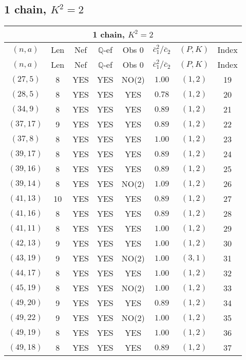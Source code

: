 \subsection{1 chain, $K^2 = 2$}
\begin{longtable}{|c|c|c|c|c|c|c|c|}
\hline
\multicolumn{8}{|c|}{1 chain, $K^2 = 2$}\\
\hline
$(n,a)$ & Len & Nef & $\mathbb Q$-ef & Obs 0 & $\overline c_1^2 / \overline c_2$ & $(P,K)$ & Index\\
\hline
\endfirsthead

\hline
$(n,a)$ & Len & Nef & $\mathbb Q$-ef & Obs 0 & $\overline c_1^2 / \overline c_2$ & $(P,K)$ & Index\\
\hline
\endhead
\hline
\endfoot

$(27,5)$ & 8 & YES & YES & NO(2) & $1.00$ & $(1,2)$ & 19\\
$(28,5)$ & 8 & YES & YES & YES & $0.78$ & $(1,2)$ & 20\\
$(34,9)$ & 8 & YES & YES & YES & $0.89$ & $(1,2)$ & 21\\
$(37,17)$ & 9 & YES & YES & YES & $0.89$ & $(1,2)$ & 22\\
$(37,8)$ & 8 & YES & YES & YES & $1.00$ & $(1,2)$ & 23\\
$(39,17)$ & 8 & YES & YES & YES & $0.89$ & $(1,2)$ & 24\\
$(39,16)$ & 8 & YES & YES & YES & $0.89$ & $(1,2)$ & 25\\
$(39,14)$ & 8 & YES & YES & NO(2) & $1.09$ & $(1,2)$ & 26\\
$(41,13)$ & 10 & YES & YES & YES & $0.89$ & $(1,2)$ & 27\\
$(41,16)$ & 8 & YES & YES & YES & $0.89$ & $(1,2)$ & 28\\
$(41,11)$ & 8 & YES & YES & YES & $1.00$ & $(1,2)$ & 29\\
$(42,13)$ & 9 & YES & YES & YES & $1.00$ & $(1,2)$ & 30\\
$(43,19)$ & 9 & YES & YES & NO(2) & $1.00$ & $(3,1)$ & 31\\
$(44,17)$ & 8 & YES & YES & YES & $1.00$ & $(1,2)$ & 32\\
$(45,19)$ & 8 & YES & YES & NO(2) & $1.00$ & $(1,2)$ & 33\\
$(49,20)$ & 9 & YES & YES & YES & $0.89$ & $(1,2)$ & 34\\
$(49,22)$ & 9 & YES & YES & NO(2) & $1.00$ & $(1,2)$ & 35\\
$(49,19)$ & 8 & YES & YES & YES & $1.00$ & $(1,2)$ & 36\\
$(49,18)$ & 8 & YES & YES & YES & $0.89$ & $(1,2)$ & 37\\

\end{longtable}

